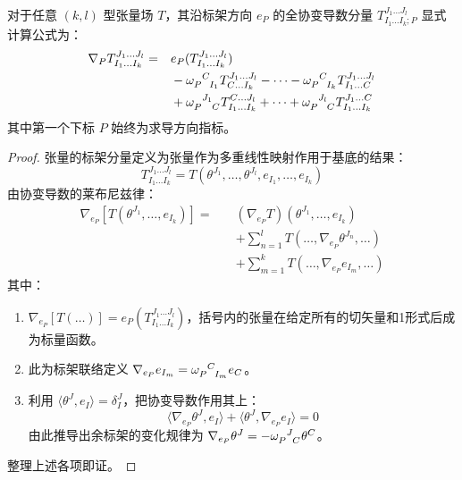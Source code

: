 \begin{theorem}[张量协变导数的标架分量公式]
    对于任意 $(k, l)$ 型张量场 $T$，其沿标架方向 $e_P$ 的全协变导数分量 $T^{J_1 \dots J_l}_{I_1 \dots I_k ; P}$ 显式计算公式为：
    \begin{equation}
    \begin{aligned}
        \nabla_P T^{J_1 \dots J_l}_{I_1 \dots I_k} = \quad & e_P(T^{J_1 \dots J_l}_{I_1 \dots I_k}) \\
        & - \tensor{\omega}{_P^C_{I_1}} T^{J_1 \dots J_l}_{C \dots I_k} - \dots - \tensor{\omega}{_P^C_{I_k}} T^{J_1 \dots J_l}_{I_1 \dots C} \\
        & + \tensor{\omega}{_P^{J_1}_C} T^{C \dots J_l}_{I_1 \dots I_k} + \dots + \tensor{\omega}{_P^{J_l}_C} T^{J_1 \dots C}_{I_1 \dots I_k}
    \end{aligned}
    \end{equation}
    其中第一个下标 $P$ 始终为求导方向指标。
\end{theorem}


\begin{proof}
    张量的标架分量定义为张量作为多重线性映射作用于基底的结果：
    \begin{equation}
        T^{J_1 \dots J_l}_{I_1 \dots I_k} = T(\theta^{J_1}, \dots, \theta^{J_l}, e_{I_1}, \dots, e_{I_k})
    \end{equation}
    由协变导数的莱布尼兹律：
    \begin{equation} \label{eq:tensor_derivation_leibniz}
    \begin{aligned}
        \nabla_{e_P} \left[ T(\theta^{J_1}, \dots, e_{I_k}) \right] = \quad & (\nabla_{e_P} T)(\theta^{J_1}, \dots, e_{I_k}) \\
        & + \sum_{n=1}^l T(\dots, \nabla_{e_P} \theta^{J_n}, \dots) \\
        & + \sum_{m=1}^k T(\dots, \nabla_{e_P} e_{I_m}, \dots)
    \end{aligned}
    \end{equation}
    其中：
    \begin{enumerate}
        \item $\nabla_{e_P} [ T(\dots) ] = e_P(T^{J_1 \dots J_l}_{I_1 \dots I_k})$，括号内的张量在给定所有的切矢量和1形式后成为标量函数。
        \item 此为标架联络定义 $\nabla_{e_P} e_{I_m} = \tensor{\omega}{_P^C_{I_m}} e_C$。
        \item 利用 $\langle \theta^{J}, e_I \rangle = \delta^{J}_I$，把协变导数作用其上：
        \[ \langle \nabla_{e_P} \theta^{J}, e_I \rangle + \langle \theta^{J}, \nabla_{e_P} e_I \rangle = 0 \]
        由此推导出余标架的变化规律为 $\nabla_{e_P} \theta^{J} = - \tensor{\omega}{_P^J_C} \theta^C$。
    \end{enumerate}
    整理上述各项即证。
\end{proof}

